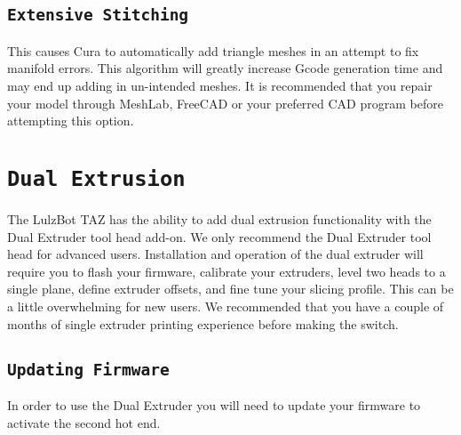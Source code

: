 \subsection{\texttt{Extensive Stitching}}
This causes Cura to automatically add triangle meshes in an attempt to fix manifold errors. This algorithm will greatly increase Gcode generation time and may end up adding in un-intended meshes. It is recommended that you repair your model through MeshLab, FreeCAD or your preferred CAD program before attempting this option.

\section{\texttt{Dual Extrusion}}
The LulzBot TAZ has the ability to add dual extrusion functionality with the Dual Extruder tool head add-on. We only recommend the Dual Extruder tool head for advanced users. Installation and operation of the dual extruder will require you to flash your firmware, calibrate your extruders, level two heads to a single plane, define extruder offsets, and fine tune your slicing profile. This can be a little overwhelming for new users. We recommended that you have a couple of months of single extruder printing experience before making the switch.

\subsection{\texttt{Updating Firmware}}
In order to use the Dual Extruder you will need to update your firmware to activate the second hot end.


